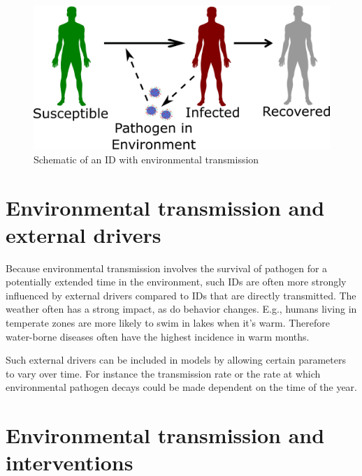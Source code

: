 \documentclass[]{book}
\theoremstyle{definition}
\theoremstyle{definition}
\theoremstyle{definition}
\theoremstyle{remark}
\begin{document}
\begin{figure}
\centering
\includegraphics{./images/environmentaltransmissionscheme.png}
\caption{Schematic of an ID with environmental transmission}
\end{figure}

\section{Environmental transmission and external
drivers}\label{environmental-transmission-and-external-drivers}

Because environmental transmission involves the survival of pathogen for
a potentially extended time in the environment, such IDs are often more
strongly influenced by external drivers compared to IDs that are
directly transmitted. The weather often has a strong impact, as do
behavior changes. E.g., humans living in temperate zones are more likely
to swim in lakes when it's warm. Therefore water-borne diseases often
have the highest incidence in warm months.

Such external drivers can be included in models by allowing certain
parameters to vary over time. For instance the transmission rate or the
rate at which environmental pathogen decays could be made dependent on
the time of the year.

\section{Environmental transmission and
interventions}\label{environmental-transmission-and-interventions}
\end{document}
